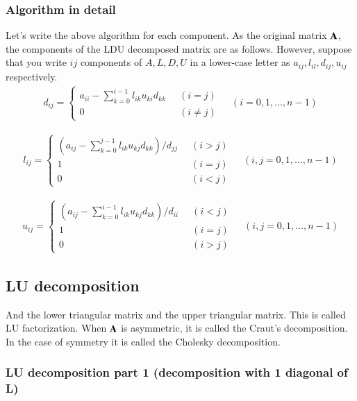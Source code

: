 \subsubsection{Algorithm in detail}

Let's write the above algorithm for each component. 
%
As the original matrix $\mathbf{A}$, the components of the LDU decomposed matrix are as follows.
%
However, suppose that you write $ij$ components of $A,L,D,U$ in a lower-case letter as $a_{ij},l_{il},d_{ij},u_{ij}$ respectively.
%
\begin{eqnarray}
d_{ij} =
\left\{\begin{array}{ll}
a_{ii} - \sum_{k=0}^{i-1}l_{ik} u_{ki} d_{kk}\;\; & (i=j)\\
0 & (i\ne j)
\end{array}\right.\;\;\;\; (i=0,1,\ldots,n-1)
\end{eqnarray}


\begin{eqnarray}
l_{ij} =
\left\{\begin{array}{ll}
\left(a_{ij} - \sum_{k=0}^{j-1} l_{ik} u_{kj} d_{kk}\right)/d_{jj}\;\; &  (i>j)\\ 1 &(i=j)\\
0 & (i<j)\end{array}\right.\;\;\;\; (i,j=0,1,\ldots,n-1)
\end{eqnarray}


\begin{eqnarray}
u_{ij} = \left\{\begin{array}{ll}
\left(a_{ij} - \sum_{k=0}^{i-1} l_{ik} u_{kj} d_{kk}\right)/d_{ii}\;\; & (i<j)\\
1 & (i=j)\\ 0 & (i>j)\end{array}\right.\;\;\;\; (i,j=0,1,\ldots,n-1)
\end{eqnarray}


\subsection{LU decomposition}

And the lower triangular matrix and the upper triangular matrix. This is called LU factorization. 
%
When $\mathbf{A}$ is asymmetric, it is called the Craut's decomposition.
%
In the case of symmetry it is called the Cholesky decomposition.

\subsubsection{LU decomposition part 1 (decomposition with 1 diagonal of L)}

